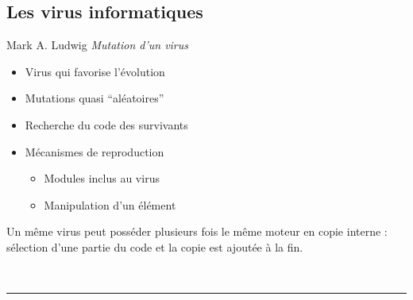 \documentclass[11pt,twoside,a4paper]{article}
\begin{document}
\clearpage

\subsection{Les virus informatiques}

\begin{minipage}{0.6\linewidth}
Mark A. Ludwig \textit{Mutation d'un virus}
\begin{itemize}
	\item Virus qui favorise l'{\'e}volution
	\item Mutations quasi ``al{\'e}atoires''
	\item Recherche du code des survivants
	\item M{\'e}canismes de reproduction
	\begin{itemize}	
		\item Modules inclus au virus
		\item Manipulation d'un {\'e}l{\'e}ment
	\end{itemize}
\end{itemize}
\end{minipage}
\begin{minipage}{0.1\linewidth}\end{minipage}
\begin{minipage}{0.3\linewidth}
Un m{\^e}me virus peut poss{\'e}der plusieurs fois le m{\^e}me moteur en copie interne : s{\'e}lection d'une partie du code et la copie est ajout{\'e}e {\`a} la fin.~\\
\end{minipage}~\\

\rule{10cm}{0.5mm}~\\
\end{document}

